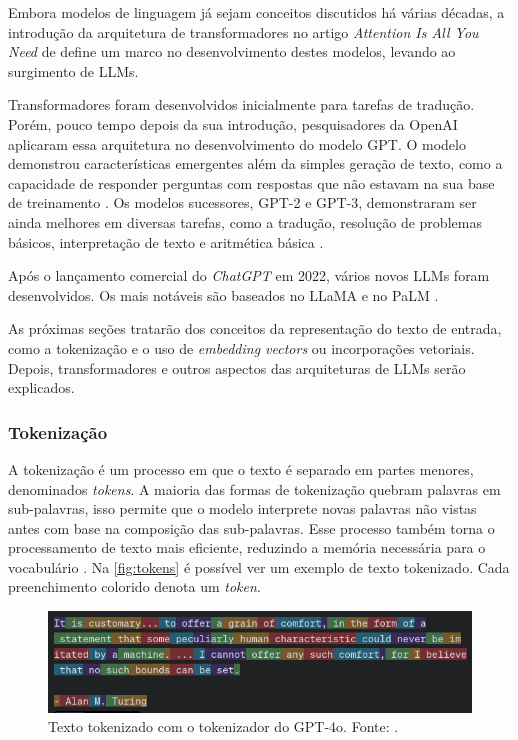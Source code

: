 Embora modelos de linguagem já sejam conceitos discutidos há várias décadas, a introdução da arquitetura de transformadores no artigo \textit{Attention Is All You Need}
de \textcite{transformer} define um marco no desenvolvimento destes modelos, levando ao surgimento de \acp{LLM}.

Transformadores foram desenvolvidos inicialmente para tarefas de tradução. Porém, pouco tempo depois da sua introdução, pesquisadores da OpenAI aplicaram essa arquitetura
no desenvolvimento do modelo \ac{GPT}. O modelo demonstrou características emergentes além da simples geração de texto, como a capacidade de responder perguntas com
respostas que não estavam na sua base de treinamento \cite{gpt1}. Os modelos sucessores, \ac{GPT}-2 e \ac{GPT}-3, demonstraram ser ainda melhores em diversas tarefas,
como a tradução, resolução de problemas básicos, interpretação de texto e aritmética básica \cite{gpt2, gpt3}.

Após o lançamento comercial do \textit{ChatGPT} em 2022, vários novos \acp{LLM} foram desenvolvidos. Os mais notáveis são baseados no \ac{LLaMA} e no \ac{PaLM}
\cite{llm_survey_2024}.

As próximas seções tratarão dos conceitos da representação do texto de entrada, como a tokenização e o uso de \textit{embedding vectors} ou incorporações vetoriais.
Depois, transformadores e outros aspectos das arquiteturas de \acp{LLM} serão explicados.

\subsubsection{Tokenização}

A tokenização é um processo em que o texto é separado em partes menores, denominados \textit{tokens}. A maioria das formas de tokenização quebram palavras em
sub-palavras, isso permite que o modelo interprete novas palavras não vistas antes com base na composição das sub-palavras. Esse processo também torna o processamento de
texto mais eficiente, reduzindo a memória necessária para o vocabulário \cite{tokenizer_performance}. Na \autoref{fig:tokens} é possível ver um exemplo de texto
tokenizado. Cada preenchimento colorido denota um \textit{token}.

\begin{figure}[ht]
      \centering
      \includegraphics[width=0.7\columnwidth,keepaspectratio]{images/tokens.png}
      \caption{\small Texto tokenizado com o tokenizador do \ac{GPT}-4o. Fonte: \textcite{tokenizer}.}
      \label{fig:tokens}
\end{figure}

